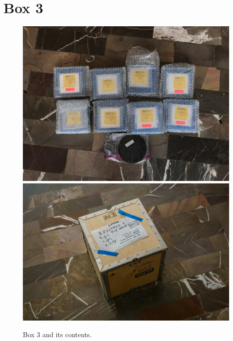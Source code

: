 \documentclass{article}
\begin{document}
\clearpage
\section{Box 3}

\begin{figure}[bp]
\begin{center}
\includegraphics[width=0.60\linewidth]{figures/20210106T114617.jpg}
\includegraphics[width=0.60\linewidth]{figures/20201209T114446.jpg}
\end{center}
\caption{Box 3 and its contents.}
\label{figure:box-three}
\end{figure}
\end{document}
